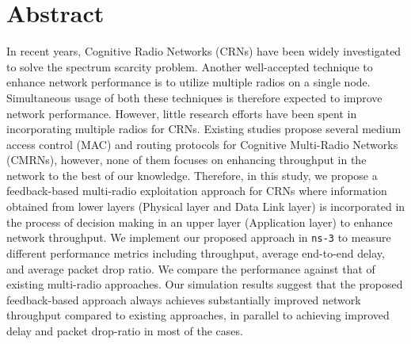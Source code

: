 \chapter*{Abstract}
 In recent years, Cognitive Radio Networks (CRNs) have been widely investigated to solve the spectrum scarcity problem. Another well-accepted technique to enhance network performance is to utilize multiple radios on a single node. Simultaneous usage of both these techniques is therefore expected to improve network performance. However, little research efforts have been spent in incorporating multiple radios for CRNs. Existing studies propose several medium access control (MAC) and routing protocols for Cognitive Multi-Radio Networks (CMRNs), however, none of them focuses on enhancing throughput in the network to the best of our knowledge. Therefore, in this study, we propose a feedback-based multi-radio exploitation approach for CRNs where information obtained from lower layers (Physical layer and Data Link layer) is incorporated in the process of decision making in an upper layer (Application layer) to enhance network throughput. We implement our proposed approach in \texttt{ns-3} to measure different performance metrics including throughput, average end-to-end delay, and average packet drop ratio. We compare the performance against that of existing multi-radio approaches. Our simulation results suggest that the proposed feedback-based approach always achieves substantially improved network throughput compared to existing approaches, in parallel to achieving improved delay and packet drop-ratio in most of the cases.
